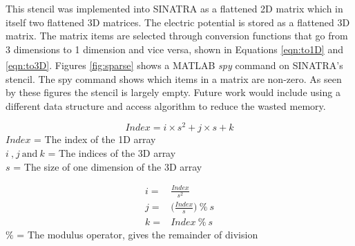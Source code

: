 \indent This stencil was implemented into SINATRA as a flattened 2D matrix which in itself two flattened 3D matrices. The electric potential is stored as a flattened 3D matrix. The matrix items are selected through conversion functions that go from 3 dimensions to 1 dimension and vice versa, shown in Equations \ref{eqn:to1D} and \ref{eqn:to3D}. Figures \ref{fig:sparse} shows a MATLAB\textsuperscript{\textregistered} \textit{spy} command on SINATRA's stencil. The spy command shows which items in a matrix are non-zero. As seen by these figures the stencil is largely empty. Future work would include using a different data structure and access algorithm to reduce the wasted memory. \par

\begin{equation}
    \label{eqn:to1D}
    Index = i \times s^2 + j \times s + k
\end{equation}
\(Index\) = The index of the 1D array \\
\(i \: \text{,} \: j \: \text{and} \: k\) = The indices of the 3D array \\
\(s\) = The size of one dimension of the 3D array \par

\begin{align}\label{eqn:to3D}
    i =& \frac{Index}{s^2} \nonumber \\
    j =& \Big(\frac{Index}{s}\Big) \: \% \: s \\
    k =& Index \: \% \: s \nonumber
\end{align}
\(\%\) = The modulus operator, gives the remainder of division \par




